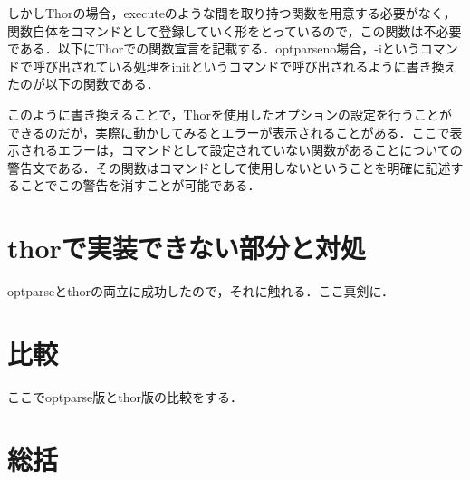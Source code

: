 しかしThorの場合，executeのような間を取り持つ関数を用意する必要がなく，関数自体をコマンドとして登録していく形をとっているので，この関数は不必要である．以下にThorでの関数宣言を記載する．optparseno場合，-iというコマンドで呼び出されている処理をinitというコマンドで呼び出されるように書き換えたのが以下の関数である．

\begin{Shaded}
\begin{Highlighting}[]
\NormalTok{, }
\NormalTok{ => }
     
\NormalTok{,}\NormalTok{)}
    \NormalTok{::}
\end{Highlighting}
\end{Shaded}

このように書き換えることで，Thorを使用したオプションの設定を行うことができるのだが，実際に動かしてみるとエラーが表示されることがある．ここで表示されるエラーは，コマンドとして設定されていない関数があることについての警告文である．その関数はコマンドとして使用しないということを明確に記述することでこの警告を消すことが可能である．

\begin{Shaded}
\begin{Highlighting}[]


\end{Highlighting}
\end{Shaded}

\section{thorで実装できない部分と対処}\label{thorux3067ux5b9fux88c5ux3067ux304dux306aux3044ux90e8ux5206ux3068ux5bfeux51e6}

optparseとthorの両立に成功したので，それに触れる．ここ真剣に．

    \section{比較}\label{ux6bd4ux8f03}

ここでoptparse版とthor版の比較をする．

    \section{総括}\label{ux7dcfux62ec}


    
    
    
    
